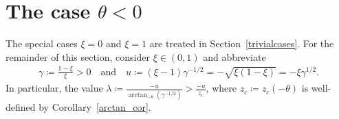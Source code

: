 \documentclass[10pt,a4paper]{amsart}
\newcommand{\1}{\mathds{1}}
\begin{document}
\section{The case \texorpdfstring{$\theta<0$}{theta<0}}\label{proofs_theta_neg}
The special cases $\xi=0$ and $\xi=1$ are treated in Section~\ref{trivialcases}. For the remainder of this section, consider $\xi\in(0,1)$ and abbreviate 
\begin{align*}
    \gamma\coloneqq\frac{1-\xi}{\xi}> 0\quad\text{and}\quad u\coloneqq (\xi-1)\gamma^{-1/2}=-\sqrt{\xi(1-\xi)}=-\xi \gamma^{1/2}.
\end{align*}
In particular, the value $\lambda\coloneqq \frac{-u}{\arctan_{-\theta}\left(\gamma^{-1/2}\right)}>\frac{-u}{z_c}$, where $z_c\coloneqq z_c(-\theta)$ is well-defined by Corollary~\ref{arctan_cor}.
\end{document}
